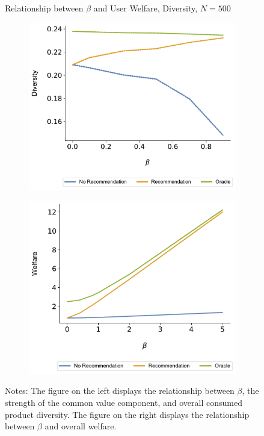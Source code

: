 \documentclass[format=acmsmall, review=true]{acmart}
\begin{document}
\begin{figure}[ht]
\caption{Relationship between $\beta$ and User Welfare, Diversity, $N = 500$}\label{fig:diversity_welfare_correlation}
\begin{subfigure}{.45\linewidth}
  \includegraphics[width=.8\linewidth]{figures/beta_diversity_N_500_T_20.pdf}
\end{subfigure}
\ContinuedFloat
\begin{subfigure}{.45\linewidth}
  \includegraphics[width=.8\linewidth]{figures/beta_welfare_N_500_T_20.pdf}
\end{subfigure}
\caption*{\scriptsize Notes: The figure on the left displays the relationship between $\beta$, the strength of the common value component, and overall consumed product diversity. The figure on the right displays the relationship between $\beta$ and overall welfare.}
\end{figure}

\addtocounter{figure}{-1}


\end{document}
